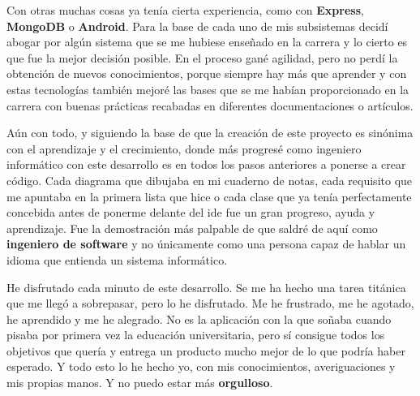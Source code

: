 Con otras muchas cosas ya tenía cierta experiencia, como con \textbf{Express}, \textbf{MongoDB} o \textbf{Android}. Para la base de cada uno de mis subsistemas decidí abogar por algún sistema que se me hubiese enseñado en la carrera y lo cierto es que fue la mejor decisión posible. En el proceso gané agilidad, pero no perdí la obtención de nuevos conocimientos, porque siempre hay más que aprender y con estas tecnologías también mejoré las bases que se me habían proporcionado en la carrera con buenas prácticas recabadas en diferentes documentaciones o artículos.

Aún con todo, y siguiendo la base de que la creación de este proyecto es sinónima con el aprendizaje y el crecimiento, donde más progresé como ingeniero informático con este desarrollo es en todos los pasos anteriores a ponerse a crear código. Cada diagrama que dibujaba en mi cuaderno de notas, cada requisito que me apuntaba en la primera lista que hice o cada clase que ya tenía perfectamente concebida antes de ponerme delante del \acrshort{ide} fue un gran progreso, ayuda y aprendizaje. Fue la demostración más palpable de que saldré de aquí como \textbf{ingeniero de software} y no únicamente como una persona capaz de hablar un idioma que entienda un sistema informático.

He disfrutado cada minuto de este desarrollo. Se me ha hecho una tarea titánica que me llegó a sobrepasar, pero lo he disfrutado. Me he frustrado, me he agotado, he aprendido y me he alegrado. No es la aplicación con la que soñaba cuando pisaba por primera vez la educación universitaria, pero sí consigue todos los objetivos que quería y entrega un producto mucho mejor de lo que podría haber esperado. Y todo esto lo he hecho yo, con mis conocimientos, averiguaciones y mis propias manos. Y no puedo estar más \textbf{orgulloso}.